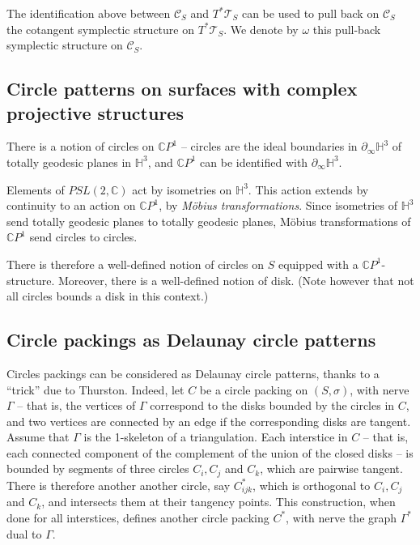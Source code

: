 \documentclass[notitlepage,twoside,a4paper]{amsart}
\theoremstyle{named}
\newcommand{\C}{{\mathbb C}}
\newcommand{\CP}{{\mathbb CP}}
\newcommand{\HH}{{\mathbb H}}
\newcommand{\cC}{{\mathcal C}}
\newcommand{\cT}{{\mathcal T}}
\begin{document}
The identification above between $\cC_S$ and $T^*\cT_S$ can be used to pull back on $\cC_S$ the cotangent symplectic structure on $T^*\cT_S$. We denote by $\omega$ this pull-back symplectic structure on $\cC_S$.

\subsection{Circle patterns on surfaces with complex projective structures}
\label{ssc:delaunay}

There is a notion of circles on $\CP^1$ -- circles are the ideal boundaries in $\partial_\infty \HH^3$ of totally geodesic planes in $\HH^3$, and $\CP^1$ can be identified with $\partial_\infty \HH^3$.

Elements of $PSL(2,\C)$ act by isometries on $\HH^3$. This action extends by continuity to an action on $\CP^1$, by {\em M\"obius transformations}. Since isometries of $\HH^3$ send totally geodesic planes to totally geodesic planes, M\"obius transformations of $\CP^1$ send circles to circles.

There is therefore a well-defined notion of circles on $S$ equipped with a $\CP^1$-structure. Moreover, there is a well-defined notion of disk. (Note however that not all circles bounds a disk in this context.)

\subsection{Circle packings as Delaunay circle patterns}
\label{ssc:special}

Circles packings can be considered as Delaunay circle patterns, thanks to a ``trick'' due to Thurston. Indeed, let $C$ be a circle packing on $(S,\sigma)$, with nerve $\Gamma$ -- that is, the vertices of $\Gamma$ correspond to the disks bounded by the circles in $C$, and two vertices are connected by an edge if the corresponding disks are tangent. Assume that $\Gamma$ is the 1-skeleton of a triangulation. Each interstice in $C$ -- that is, each connected component of the complement of the union of the closed disks -- is bounded by segments of three circles $C_i, C_j$ and $C_k$, which are pairwise tangent. There is therefore another another circle, say $C^*_{ijk}$, which is orthogonal to $C_i, C_j$ and $C_k$, and intersects them at their tangency points. This construction, when done for all interstices, defines another circle packing $C^*$, with nerve the graph $\Gamma^*$ dual to $\Gamma$.
\end{document}
